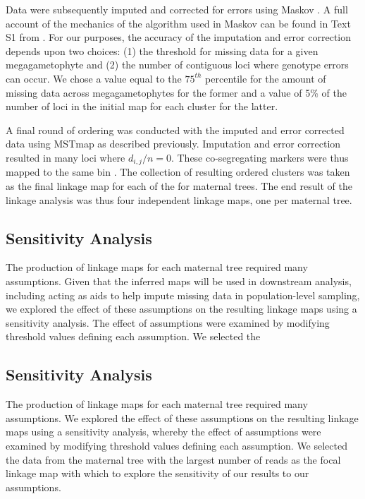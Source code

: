 \documentclass[11pt]{article}
\begin{document}
Data were subsequently imputed and corrected for errors using Maskov \citep{Ward:2013}. A full account of the mechanics of the algorithm
used in Maskov can be found in Text S1 from \citet{Ward:2013}. For our purposes, the accuracy of the imputation and
error correction depends upon two choices: (1) the threshold for missing data for a given megagametophyte and (2) the number of 
contiguous loci where genotype errors can occur. We chose a value equal to the $75^{th}$ percentile for the amount of 
missing data across megagametophytes for the former and a value of 5\% of the number of loci in the initial map for each
cluster for the latter.

A final round of ordering was conducted with the imputed and error corrected data using MSTmap as described previously. Imputation 
and error correction resulted in many loci where $d_{i,j}/n = 0$. These co-segregating markers were thus mapped to the same bin
\citep[see][]{Wu:2008a}. The collection of resulting ordered clusters was taken as the final linkage map for each of the for maternal trees. 
The end result of the linkage analysis was thus four independent linkage maps, one per maternal tree.

\subsection*{Sensitivity Analysis}
The production of linkage maps for each maternal tree required many assumptions.
Given that the inferred maps will be used in downstream analysis, including acting as aids
to help impute missing data in population-level sampling, we explored the effect of these assumptions on 
the resulting linkage maps using a sensitivity analysis. The effect of assumptions 
were examined by modifying threshold values defining each assumption. We selected the
\subsection*{Sensitivity Analysis}\label{ss:sensitivity}

The production of linkage maps for each maternal tree required many assumptions. We
explored the effect of these assumptions on the resulting linkage maps using a sensitivity
analysis, whereby the effect of assumptions were examined by modifying threshold values defining each assumption. We selected the
data from the maternal tree with the largest number of reads as the focal linkage map with which to explore
the sensitivity of our results to our assumptions.
\end{document}
